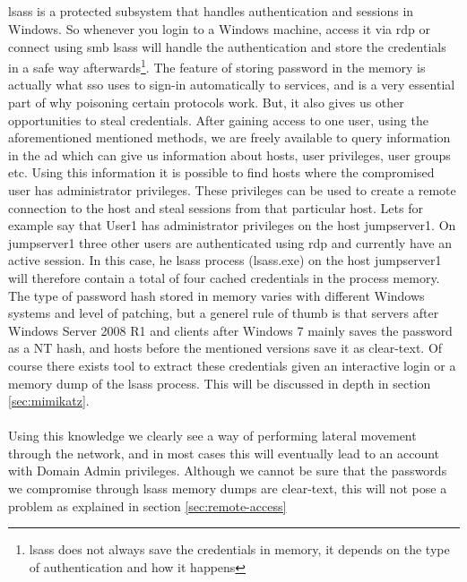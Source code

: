 \documentclass{article}
\begin{document}
\subsection{}
\label{sec:lsass}
\gls{lsass} is a protected subsystem that handles authentication and sessions in Windows. So whenever you login to a Windows machine, access it via \gls{rdp} or connect using \gls{smb} \gls{lsass} will handle the authentication and store the credentials in a safe way afterwards\footnote{\gls{lsass} does not always save the credentials in memory, it depends on the type of authentication and how it happens\cite{url:lsass:cred-in-memory}}.
The feature of storing password in the memory is actually what \gls{sso} uses to sign-in automatically to services, and is a very essential part of why poisoning certain protocols work. But, it also gives us other opportunities to steal credentials. After gaining access to one user, using the aforementioned mentioned methods, we are freely available to query information in the \gls{ad} which can give us information about hosts, user privileges, user groups etc. Using this information it is possible to find hosts where the compromised user has administrator privileges. These privileges can be used to create a remote connection to the host and steal sessions from that particular host. Lets for example say that User1 has administrator privileges on the host jumpserver1. On jumpserver1 three other users are authenticated using \gls{rdp} and currently have an active session. In this case, he \gls{lsass} process (lsass.exe) on the host jumpserver1 will therefore contain a total of four cached credentials in the process memory. The type of password hash stored in memory varies with different Windows systems and level of patching, but a generel rule of thumb is that servers after Windows Server 2008 R1 and clients after Windows 7 mainly saves the password as a NT hash, and hosts before the mentioned versions save it as clear-text\cite{url:lsass:clear-text-2008}. Of course there exists tool to extract these credentials given an interactive login or a memory dump of the \gls{lsass} process. This will be discussed in depth in section \ref{sec:mimikatz}.
\\\\
Using this knowledge we clearly see a way of performing lateral movement through the network, and in most cases this will eventually lead to an account with Domain Admin privileges. Although we cannot be sure that the passwords we compromise through \gls{lsass} memory dumps are clear-text, this will not pose a problem as explained in section \ref{sec:remote-access}
\end{document}
